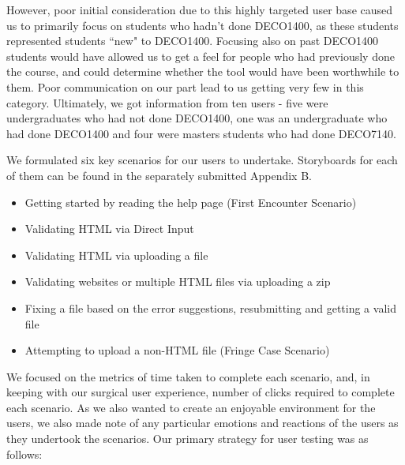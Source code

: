 \documentclass[10pt]{article}
\begin{document}
However, poor initial consideration due to this highly targeted user base caused us to primarily focus on students who hadn't done DECO1400, as these students represented students ``new" to DECO1400. Focusing also on past DECO1400 students would have allowed us to get a feel for people who had previously done the course, and could determine whether the tool would have been worthwhile to them. Poor communication on our part lead to us getting very few in this category. Ultimately, we got information from ten users - five were undergraduates who had not done DECO1400, one was an undergraduate who had done DECO1400 and four were masters students who had done DECO7140.

We formulated six key scenarios for our users to undertake. Storyboards for each of them can be found in the separately submitted Appendix B.

\begin{itemize}
\item Getting started by reading the help page (First Encounter Scenario)
\item Validating HTML via Direct Input
\item Validating HTML via uploading a file
\item Validating websites or multiple HTML files via uploading a zip
\item Fixing a file based on the error suggestions, resubmitting and getting a valid file
\item Attempting to upload a non-HTML file (Fringe Case Scenario)
\end{itemize}

We focused on the metrics of time taken to complete each scenario, and, in keeping with our surgical user experience, number of clicks required to complete each scenario. As we also wanted to create an enjoyable environment for the users, we also made note of any particular emotions and reactions of the users as they undertook the scenarios. Our primary strategy for user testing was as follows:
\end{document}
